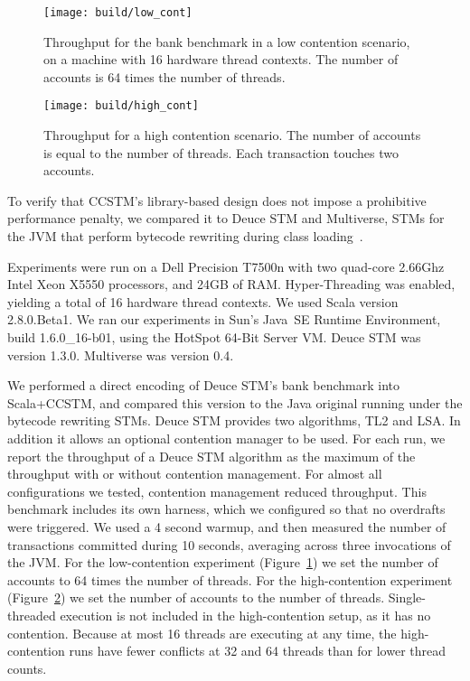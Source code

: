 
\begin{figure}
  \centering \texttt{[image: build/low\_cont]}

\caption{Throughput for the bank benchmark in a low contention scenario,
on a machine with 16 hardware thread contexts.  The number of accounts
is 64 times the number of threads.}

  \label{fig:lowcont}
\end{figure}

\begin{figure}
  \centering \texttt{[image: build/high\_cont]}

\caption{Throughput for a high contention scenario.  The number of accounts is
equal to the number of threads.  Each transaction touches two accounts.}

  \label{fig:highcont}
\end{figure}

To verify that CCSTM's library-based design does not impose a prohibitive
performance penalty, we compared it to Deuce STM and Multiverse, STMs for
the JVM that perform bytecode rewriting during class
loading~\cite{deucestm,multiverse}.

Experiments were run on a Dell Precision T7500n with two quad-core
2.66Ghz Intel Xeon X5550 processors, and 24GB of RAM.  Hyper-Threading was
enabled, yielding a total of 16 hardware thread contexts.  We used Scala
version 2.8.0.Beta1.  We ran our experiments in
Sun's Java~SE Runtime Environment, build 1.6.0\_16-b01, using the HotSpot
64-Bit Server VM.  Deuce STM was version 1.3.0.  Multiverse was version 0.4.

We performed a direct encoding of Deuce STM's bank benchmark into
Scala+CCSTM, and compared this version to the Java original running
under the bytecode rewriting STMs.  Deuce STM provides two algorithms,
TL2 and LSA.  In addition it allows an optional contention manager to
be used.  For each run, we report the throughput of a Deuce STM algorithm
as the maximum of the throughput with or without contention management.
For almost all configurations we tested, contention management reduced
throughput.  This benchmark includes its own harness, which we configured
so that no overdrafts were triggered.  We used a 4 second warmup, and
then measured the number of transactions committed during 10 seconds,
averaging across three invocations of the JVM.  For the low-contention
experiment (Figure~\ref{fig:lowcont}) we set the number of accounts to
64 times the number of threads.  For the high-contention experiment
(Figure~\ref{fig:highcont}) we set the number of accounts to the
number of threads.  Single-threaded execution is not included in the
high-contention setup, as it has no contention.  Because at most 16
threads are executing at any time, the high-contention runs have fewer
conflicts at 32 and 64 threads than for lower thread counts.

